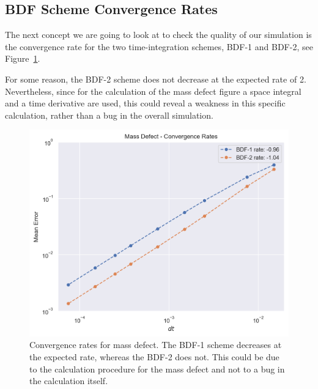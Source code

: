 \documentclass[../../thesis.tex]{subfiles}
\begin{document}
\subsection{BDF Scheme Convergence Rates}
\label{sec:fom_calibration_bdf_convergence_rates}
The next concept we are going to look at to check the quality of our simulation is 
the convergence rate for the two time-integration schemes, BDF-1 and BDF-2, see Figure~\ref{fig:bdf_convergence_rates}.

For some reason, the BDF-2 scheme does not decrease at the expected rate of 2.
Nevertheless, since for the calculation of the mass defect figure a space integral and a time derivative are used, 
this could reveal a weakness in this specific calculation, 
rather than a bug in the overall simulation.
\begin{figure}[h]
    \centering
    \includegraphics[width=1\columnwidth]{research_project/piston/figures/bdf_convergence/convergence_rates_mass.png}
    \caption{Convergence rates for mass defect.
    The BDF-1 scheme decreases at the expected rate, whereas the BDF-2 does not.
    This could be due to the calculation procedure for the mass defect and not to a bug in the calculation itself.}
    \label{fig:bdf_convergence_rates}
\end{figure}
\end{document}
